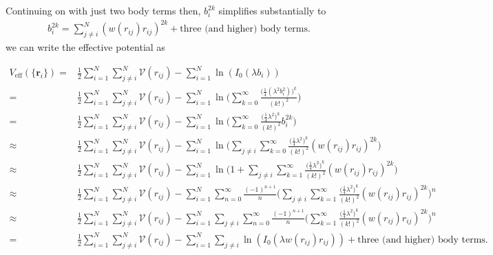 \documentclass[../main.tex]{subfiles}
\begin{document}
Continuing on with just two body terms then, $b_i^{2k}$ simplifies
substantially to
\begin{align}
  b_i^{2k}=\sum_{j\neq i}^N(w(r_{ij})r_{ij})^{2k}
  +\textrm{three (and higher) body terms}.
\end{align}
we can write the effective
potential as
\begin{widetext}
  \begin{align}
    V_{\mathrm{eff}}(\{\bm{r}_i\})
    =&\frac{1}{2}\sum_{i=1}^N\sum_{j\neq i}^N\mathcal{V}(r_{ij})
    -\sum_{i=1}^N\ln(I_0(\lambda b_i))\nonumber\\
    =&\frac{1}{2}\sum_{i=1}^N\sum_{j\neq i}^N\mathcal{V}(r_{ij})
    -\sum_{i=1}^N\ln\bigg(\sum_{k=0}^{\infty}
    \frac{\bigg(\frac{1}{4}(\lambda^2 b_i^2)\bigg)^k}{(k!)^2}\bigg)\nonumber\\
    =&\frac{1}{2}\sum_{i=1}^N\sum_{j\neq i}^N\mathcal{V}(r_{ij})
    -\sum_{i=1}^N\ln\bigg(\sum_{k=0}^{\infty}
    \frac{\bigg(\frac{1}{4}\lambda^2\bigg)^k}{(k!)^2}b_i^{2k}\bigg)\nonumber\\
    \approx&\frac{1}{2}\sum_{i=1}^N\sum_{j\neq i}^N\mathcal{V}(r_{ij})
    -\sum_{i=1}^N\ln\bigg(\sum_{j\neq i}\sum_{k=0}^{\infty}
    \frac{\bigg(\frac{1}{4}\lambda^2\bigg)^k}{(k!)^2}
    (w(r_{ij})r_{ij})^{2k}\bigg)\nonumber\\
    \approx&\frac{1}{2}\sum_{i=1}^N\sum_{j\neq i}^N\mathcal{V}(r_{ij})
    -\sum_{i=1}^N\ln\bigg(1+\sum_{j\neq i}\sum_{k=1}^{\infty}
    \frac{\bigg(\frac{1}{4}\lambda^2\bigg)^k}{(k!)^2}
    (w(r_{ij})r_{ij})^{2k}\bigg)\nonumber\\
    \approx&\frac{1}{2}\sum_{i=1}^N\sum_{j\neq i}^N\mathcal{V}(r_{ij})
    -\sum_{i=1}^N\sum_{n=0}^{\infty}\frac{(-1)^{n+1}}{n}
    \bigg(\sum_{j\neq i}\sum_{k=1}^{\infty}
    \frac{\bigg(\frac{1}{4}\lambda^2\bigg)^k}{(k!)^2}
    (w(r_{ij})r_{ij})^{2k}\bigg)^n\nonumber\\
    \approx&\frac{1}{2}\sum_{i=1}^N\sum_{j\neq i}^N\mathcal{V}(r_{ij})
    -\sum_{i=1}^N\sum_{j\neq i}\sum_{n=0}^{\infty}\frac{(-1)^{n+1}}{n}
    \bigg(\sum_{k=1}^{\infty}
    \frac{\bigg(\frac{1}{4}\lambda^2\bigg)^k}{(k!)^2}
    (w(r_{ij})r_{ij})^{2k}\bigg)^n\nonumber\\
    =&\frac{1}{2}\sum_{i=1}^N\sum_{j\neq i}^N\mathcal{V}(r_{ij})
    -\sum_{i=1}^N\sum_{j\neq i}\ln(I_0(\lambda w(r_{ij})r_{ij}))
    +\textrm{three (and higher) body terms}.
  \end{align}
\end{widetext}
\end{document}
